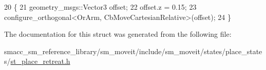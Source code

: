\begin{DoxyCode}
20     \{
21         geometry\_msgs::Vector3 offset;
22         offset.z = 0.15;
23         configure\_orthogonal<OrArm, CbMoveCartesianRelative>(offset);
24     \}
\end{DoxyCode}


The documentation for this struct was generated from the following file\+:\begin{DoxyCompactItemize}
\item 
smacc\+\_\+sm\+\_\+reference\+\_\+library/sm\+\_\+moveit/include/sm\+\_\+moveit/states/place\+\_\+states/\hyperlink{include_2sm__moveit_2states_2place__states_2st__place__retreat_8h}{st\+\_\+place\+\_\+retreat.\+h}\end{DoxyCompactItemize}
